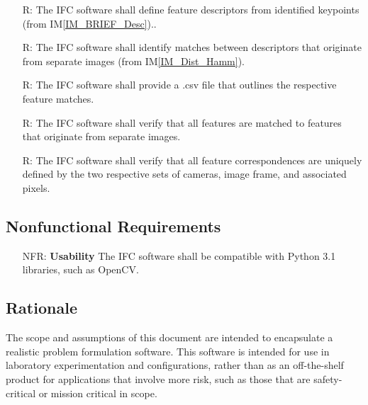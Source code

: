 \documentclass[12pt]{article}
\newcommand{\iref}[1]{IM\ref{#1}}
\newcounter{reqnum} %
\newcounter{nfrnum} %
\begin{document}
\begin{itemize}
\item[R\refstepcounter{reqnum}\thereqnum \label{R_DefineDescriptors}:] The IFC software shall 
define feature descriptors from identified keypoints (from \iref{IM_BRIEF_Desc})..

\item[R\refstepcounter{reqnum}\thereqnum \label{R_CompareDescriptors}:] The IFC software shall 
identify matches between descriptors that originate from separate images (from \iref{IM_Dist_Hamm}).

\item[R\refstepcounter{reqnum}\thereqnum \label{R_OutputCorrespondences}:] The IFC software shall 
provide a .csv file that outlines the respective feature matches.

\item[R\refstepcounter{reqnum}\thereqnum \label{R_DistinctImages}:] The IFC software shall verify 
that all features are matched to features that originate from separate images.

\item[R\refstepcounter{reqnum}\thereqnum \label{R_UniqueMatch_IDs}:] The IFC software shall verify 
that all feature correspondences are uniquely defined by the two respective sets of cameras, image frame, 
and associated pixels.

\end{itemize}

\subsection{Nonfunctional Requirements}

\noindent \begin{itemize}

\item[NFR\refstepcounter{nfrnum}\thenfrnum \label{NFR_Usability}:] \textbf{Usability}
  The IFC software shall be compatible with Python 3.1 libraries, such as OpenCV.

\end{itemize}

\subsection{Rationale}

The scope and assumptions of this document are intended to encapsulate a realistic problem formulation 
software. This software is intended for use in laboratory experimentation and configurations, rather than 
as an off-the-shelf product for applications that involve more risk, such as those that are safety-critical 
or mission critical in scope.
\end{document}
